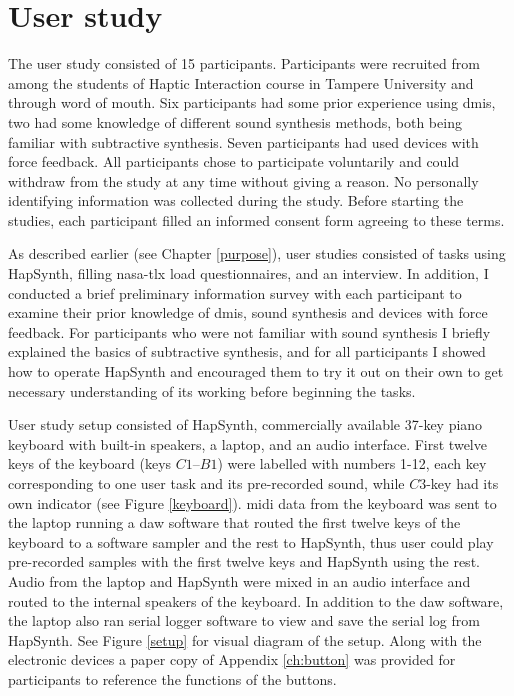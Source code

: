 \section{User study} \label{userstudy}

The user study consisted of 15 participants. Participants were recruited from among the students of Haptic Interaction course in Tampere University and through word of mouth. Six participants had some prior experience using \glspl{dmi}, two had some knowledge of different sound synthesis methods, both being familiar with subtractive synthesis. Seven participants had used devices with force feedback. All participants chose to participate voluntarily and could withdraw from the study at any time without giving a reason. No personally identifying information was collected during the study. Before starting the studies, each participant filled an informed consent form agreeing to these terms.

As described earlier (see Chapter \ref{purpose}), user studies consisted of tasks using HapSynth, filling \gls{nasa-tlx} load questionnaires, and an interview. In addition, I conducted a brief preliminary information survey with each participant to examine their prior knowledge of \glspl{dmi}, sound synthesis and devices with force feedback. For participants who were not familiar with sound synthesis I briefly explained the basics of subtractive synthesis, and for all participants I showed how to operate HapSynth and encouraged them to try it out on their own to get necessary understanding of its working before beginning the tasks.

User study setup consisted of HapSynth, commercially available 37-key piano keyboard with built-in speakers, a laptop, and an audio interface. First twelve keys of the keyboard (keys $C1$--$B1$) were labelled with numbers 1-12, each key corresponding to one user task and its pre-recorded sound, while $C3$-key had its own indicator (see Figure \ref{keyboard}). \gls{midi} data from the keyboard was sent to the laptop running a \gls{daw} software that routed the first twelve keys of the keyboard to a software sampler and the rest to HapSynth, thus user could play pre-recorded samples with the first twelve keys and HapSynth using the rest. Audio from the laptop and HapSynth were mixed in an audio interface and routed to the internal speakers of the keyboard. In addition to the \gls{daw} software, the laptop also ran serial logger software to view and save the serial log from HapSynth. See Figure \ref{setup} for visual diagram of the setup. Along with the electronic devices a paper copy of Appendix \ref{ch:button} was provided for participants to reference the functions of the buttons.

